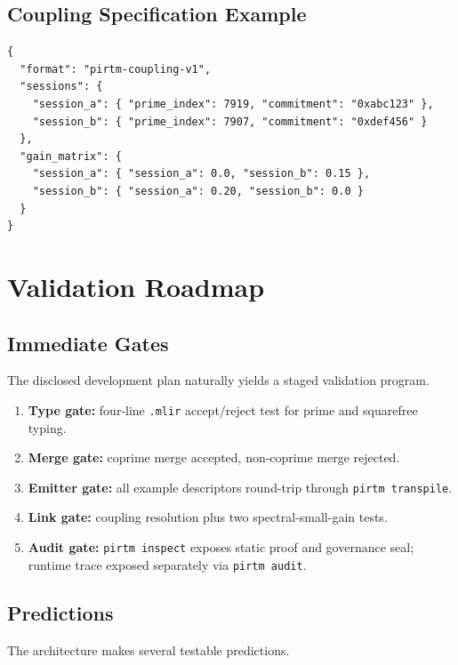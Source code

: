 \documentclass[11pt]{article}
\begin{document}
\subsection{Coupling Specification Example}

\begin{lstlisting}[style=plain,caption={Illustrative coupling specification with human aliases and canonical identities}]
{
  "format": "pirtm-coupling-v1",
  "sessions": {
    "session_a": { "prime_index": 7919, "commitment": "0xabc123" },
    "session_b": { "prime_index": 7907, "commitment": "0xdef456" }
  },
  "gain_matrix": {
    "session_a": { "session_a": 0.0, "session_b": 0.15 },
    "session_b": { "session_a": 0.20, "session_b": 0.0 }
  }
}
\end{lstlisting}

\section{Validation Roadmap}

\subsection{Immediate Gates}

The disclosed development plan naturally yields a staged validation program.

\begin{enumerate}[leftmargin=2em]
  \item \textbf{Type gate:} four-line \texttt{.mlir} accept/reject test for prime and squarefree typing.
  \item \textbf{Merge gate:} coprime merge accepted, non-coprime merge rejected.
  \item \textbf{Emitter gate:} all example descriptors round-trip through \texttt{pirtm transpile}.
  \item \textbf{Link gate:} coupling resolution plus two spectral-small-gain tests.
  \item \textbf{Audit gate:} \texttt{pirtm inspect} exposes static proof and governance seal; runtime trace exposed separately via \texttt{pirtm audit}.
\end{enumerate}

\subsection{Predictions}

The architecture makes several testable predictions.
\end{document}
